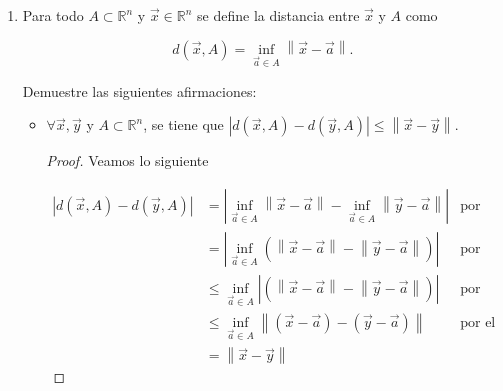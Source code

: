 \documentclass[letterpaper]{article}
\theoremstyle{definition}
\theoremstyle{lemathm}
\theoremstyle{lemathm}
\theoremstyle{lemathm}
\theoremstyle{lemademthm}
\newcommand{\abs}[1]{\left| #1 \right| }
\newcommand{\pars}[1]{\left( #1 \right) }
\newcommand{\norm}[1]{\left\lVert#1\right\rVert}
\newcommand{\RR}{\mathbb{R}}
\newcommand{\1}{\mathbbm{1}}
\begin{document}
\begin{enumerate}
\begin{itemize}
\begin{proof}
			\end{proof}


			\item $A^{\circ} \cap \partial A=\emptyset$ y $\partial A = \overline{A}\setminus A^{\circ}$. Deducir que $\overline{A}\setminus A \subset A'$.
			
			\begin{proof}
				
				Si $x\in\partial A$ entonces $\forall \epsilon > 0, B\pars{x,\epsilon}\cap A^c \neq \emptyset$ por lo que $B\pars{x,\epsilon} \not\subset A$ y $x\not\in A^{\circ}$. Por lo tanto $A^{\circ} \cap \partial A = \emptyset$. Como $A^{\circ}\cup\partial A = \overline{A}$ entonces $\partial A = \overline{A}\setminus A^{\circ}$.
	
				Como $\overline{A} = A \cup A'$ entonces $\overline{A}\setminus A = \pars{A \cup A'}\setminus A =  = A'\setminus A \subset A'$.

			\end{proof}


		\end{itemize}

		\item Para todo $A\subset\RR^n$ y $\vec{x}\in\RR^n$ se define la distancia entre $\vec{x}$ y $A$ como
		
		\[d\pars{\vec{x},A}=\inf_{\vec{a}\in A} \norm{\vec{x}-\vec{a}}.\]

		Demuestre las siguientes afirmaciones:

		\begin{itemize}
			\item $\forall \vec{x},\vec{y}$ y $A\subset\RR^n$, se tiene que $\abs{d\pars{\vec{x},A} - d\pars{\vec{y},A}} \leq \norm{\vec{x}-\vec{y}}$.
			
			\begin{proof}
				
				Veamos lo siguiente
	
				\begin{align*}
					\abs{d\pars{\vec{x},A} - d\pars{\vec{y},A}} &= \abs{\inf_{\vec{a}\in A} \norm{\vec{x}-\vec{a}} - \inf_{\vec{a}\in A} \norm{\vec{y}-\vec{a}}} & \text{por definición de métrica}\\
					&= \abs{\inf_{\vec{a}\in A} \pars{\norm{\vec{x}-\vec{a}} - \norm{\vec{y}-\vec{a}}}} & \text{por propiedad del ínfimo}\\
					&\leq \inf_{\vec{a}\in A}\abs{\pars{\norm{\vec{x}-\vec{a}} - \norm{\vec{y}-\vec{a}}}} & \text{por propiedad del ínfimo}\\
					&\leq \inf_{\vec{a}\in A} \norm{\pars{\vec{x}-\vec{a}}-\pars{\vec{y}-\vec{a}}} & \text{por el útimo ejercicio de la tarea 1}\\
					&= \norm{\vec{x}-\vec{y}}
				\end{align*}


\end{proof}
\end{itemize}
\end{enumerate}
\end{document}
